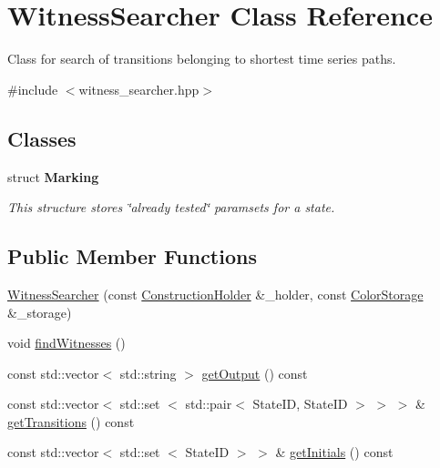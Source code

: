 \hypertarget{classWitnessSearcher}{\section{\-Witness\-Searcher \-Class \-Reference}
\label{classWitnessSearcher}
}


\-Class for search of transitions belonging to shortest time series paths.  




{\ttfamily \#include $<$witness\-\_\-searcher.\-hpp$>$}

\subsection*{\-Classes}
\begin{DoxyCompactItemize}
\item 
struct {\bfseries \-Marking}
\begin{DoxyCompactList}\small\item\em \-This structure stores \char`\"{}already tested\char`\"{} paramsets for a state. \end{DoxyCompactList}\end{DoxyCompactItemize}
\subsection*{\-Public \-Member \-Functions}
\begin{DoxyCompactItemize}
\item 
\hyperlink{classWitnessSearcher_ad228f655ca01b5edecb2245218cd123f}{\-Witness\-Searcher} (const \hyperlink{classConstructionHolder}{\-Construction\-Holder} \&\-\_\-holder, const \hyperlink{classColorStorage}{\-Color\-Storage} \&\-\_\-storage)
\item 
void \hyperlink{classWitnessSearcher_a2d1153ac29c1e1ad653798564a067e29}{find\-Witnesses} ()
\item 
const std\-::vector$<$ std\-::string $>$ \hyperlink{classWitnessSearcher_a00d963143076bbb09f12c361f814f24f}{get\-Output} () const 
\item 
const std\-::vector$<$ std\-::set\*
$<$ std\-::pair$<$ \-State\-I\-D, \-State\-I\-D $>$ $>$ $>$ \& \hyperlink{classWitnessSearcher_a58a37b8190683b9adf5eaf5a4c9b3e68}{get\-Transitions} () const 
\item 
const std\-::vector$<$ std\-::set\*
$<$ \-State\-I\-D $>$ $>$ \& \hyperlink{classWitnessSearcher_a4d2540526995ff077c33c6a62670a047}{get\-Initials} () const 
\end{DoxyCompactItemize}


